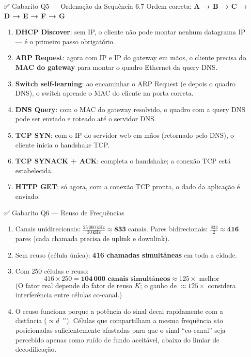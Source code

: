 \documentclass[11pt,a4paper]{article}
\begin{document}
\begin{gabaritocaixa}{✅ Gabarito Q5 --- Ordenação da Sequência 6.7}
Ordem correta: \textbf{A → B → C → D → E → F → G}

\begin{enumerate}[label=(\Alph*)]
    \item \textbf{DHCP Discover}: sem IP, o cliente não pode montar nenhum datagrama IP --- é o primeiro passo obrigatório.
    \item \textbf{ARP Request}: agora com IP e IP do gateway em mãos, o cliente precisa do \textbf{MAC do gateway} para montar o quadro Ethernet da query DNS.
    \item \textbf{Switch self-learning}: ao encaminhar o ARP Request (e depois o quadro DNS), o switch aprende o MAC do cliente na porta correta.
    \item \textbf{DNS Query}: com o MAC do gateway resolvido, o quadro com a query DNS pode ser enviado e roteado até o servidor DNS.
    \item \textbf{TCP SYN}: com o IP do servidor web em mãos (retornado pelo DNS), o cliente inicia o handshake TCP.
    \item \textbf{TCP SYNACK + ACK}: completa o handshake; a conexão TCP está estabelecida.
    \item \textbf{HTTP GET}: só agora, com a conexão TCP pronta, o dado da aplicação é enviado.
\end{enumerate}
\end{gabaritocaixa}

\begin{gabaritocaixa}{✅ Gabarito Q6 --- Reuso de Frequências}
\begin{enumerate}[label=(\alph*)]
    \item Canais unidirecionais: $\frac{25\,000\,\text{kHz}}{30\,\text{kHz}} \approx \mathbf{833}$ canais. Pares bidirecionais: $\frac{833}{2} \approx \mathbf{416}$ pares (cada chamada precisa de uplink e downlink).
    \item Sem reuso (célula única): \textbf{416 chamadas simultâneas} em toda a cidade.
    \item Com 250 células e reuso:
    \[416 \times 250 = \mathbf{104\,000 \text{ canais simultâneos}} \approx 125\times \text{ melhor}\]
    (O fator real depende do fator de reuso $K$; o ganho de $\approx 125\times$ considera interferência entre células co-canal.)
    \item O reuso funciona porque a potência do sinal decai rapidamente com a distância ($\propto d^{-\alpha}$). Células que compartilham a mesma frequência são posicionadas suficientemente afastadas para que o sinal ``co-canal'' seja percebido apenas como ruído de fundo aceitável, abaixo do limiar de decodificação.
\end{enumerate}
\end{gabaritocaixa}
\end{document}

